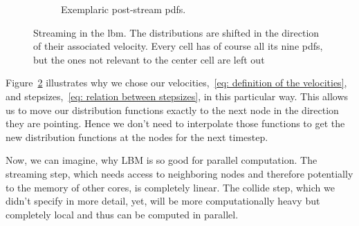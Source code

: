 \begin{figure}
\begin{subfigure}{.5\textwidth}
    \caption{Exemplaric post-stream \glspl{pdf}.\linebreak}
\label{fig: post-collision example}
\end{subfigure}
\caption{Streaming in the \gls{lbm}. The distributions are shifted in the direction of their associated velocity. Every cell has of course all its nine \glspl{pdf}, but the ones not relevant to the center cell are left out}
\label{fig: examplary stream}
\end{figure}

Figure~\ref{fig: examplary stream} illustrates why we chose our velocities,~\eqref{eq: definition of the velocities}, and stepsizes,~\eqref{eq: relation between stepsizes}, in this particular way.
This allows us to move our distribution functions exactly to the next node in the direction they are pointing. Hence we don't need to interpolate those functions to get the new distribution functions at the nodes for the next timestep.

Now, we can imagine, why LBM is so good for parallel computation.
The streaming step, which needs access to neighboring nodes and therefore potentially to the memory of other cores, is completely linear.
The collide step, which we didn't specify in more detail, yet, will be more computationally heavy but completely local and thus can be computed in parallel.
